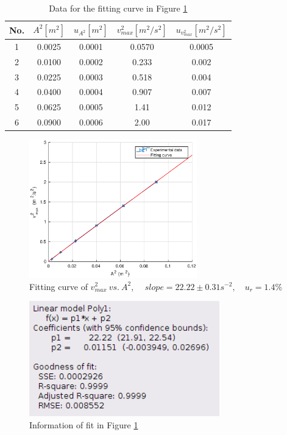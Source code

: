     \begin{table}[h] \small
        \centering
        \begin{tabular}{|c|c|c|c|c|}
            \hline
            No. & $A^2[m^2]$ & $u_{A^2}[m^2]$ & $v_{max}^2[m^2/s^2]$ & $u_{v_{max}^2}[m^2/s^2]$\\ \hline
            1 & 0.0025 & 0.0001 & 0.0570 & 0.0005\\ \hline
            2 & 0.0100 & 0.0002 & 0.233 & 0.002  \\ \hline
            3 & 0.0225 & 0.0003 & 0.518 & 0.004  \\ \hline
            4 & 0.0400 & 0.0004 & 0.907 & 0.007  \\ \hline
            5 & 0.0625 & 0.0005 & 1.41 & 0.012   \\ \hline
            6 & 0.0900 & 0.0006 & 2.00 & 0.017   \\ \hline
        \end{tabular}
        \caption{Data for the fitting curve in Figure \ref{va}}\label{vadata}
    \end{table}
    \begin{figure}[!h]
        \centering
        \includegraphics[height=6cm]{images/va.eps}
        \caption{Fitting curve of $v_{max}^2\ vs.\ A^2$, $\quad slope=22.22\pm0.31s^{-2}, \quad u_r=1.4\%$}\label{va}
    \end{figure}
    \begin{figure}[!h]
        \centering
        \includegraphics[height=5cm]{images/vainfo.png}
        \caption{Information of fit in Figure \ref{va}}\label{vainfo}
    \end{figure}